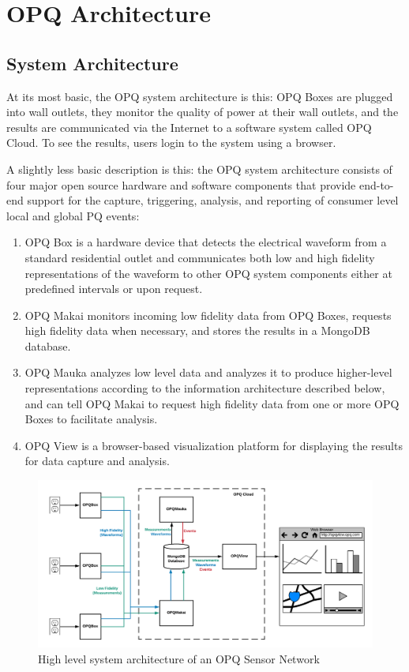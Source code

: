 \section{OPQ Architecture}
\label{sec:architecture}

\subsection{System Architecture}

At its most basic, the OPQ system architecture is this: OPQ Boxes are plugged into wall outlets, they monitor the quality of power at their wall outlets, and the results are communicated via the Internet to a software system called OPQ Cloud. To see the results, users login to the system using a browser.

A slightly less basic description is this: the OPQ system architecture consists of four major open source hardware and software components that provide end-to-end support for the capture, triggering, analysis, and reporting of consumer level local and global PQ events:

\begin{enumerate}

\item OPQ Box is a hardware device that detects the electrical waveform from a standard residential outlet and communicates both low and high fidelity representations of the waveform to other OPQ system components either at predefined intervals or upon request.

\item OPQ Makai monitors incoming low fidelity data from OPQ Boxes, requests high fidelity data when necessary, and stores the results in a MongoDB database.

\item OPQ Mauka analyzes low level data and analyzes it to produce higher-level representations according to the information architecture described below, and can tell OPQ Makai to request high fidelity data from one or more OPQ Boxes to facilitate analysis.

\item OPQ View is a browser-based visualization platform for displaying the results for data capture and analysis.

\end{enumerate}

\begin{figure}
\center \includegraphics[width=5in]{images/architecture/system-diagram.png}
\caption{High level system architecture of an OPQ Sensor Network}
\label{fig:architecture}
\end{figure}


